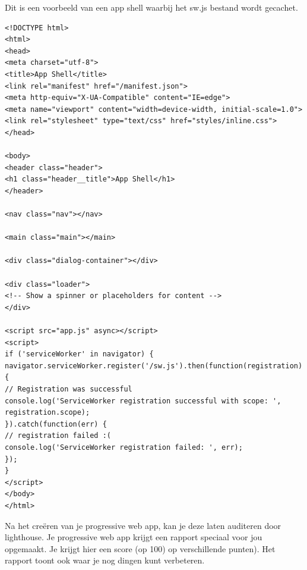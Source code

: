 Dit is een voorbeeld van een app shell waarbij het sw.js bestand wordt gecachet. 


\begin{lstlisting}
<!DOCTYPE html>
<html>
<head>
<meta charset="utf-8">
<title>App Shell</title>
<link rel="manifest" href="/manifest.json">
<meta http-equiv="X-UA-Compatible" content="IE=edge">
<meta name="viewport" content="width=device-width, initial-scale=1.0">
<link rel="stylesheet" type="text/css" href="styles/inline.css">
</head>

<body>
<header class="header">
<h1 class="header__title">App Shell</h1>
</header>

<nav class="nav"></nav>

<main class="main"></main>

<div class="dialog-container"></div>

<div class="loader">
<!-- Show a spinner or placeholders for content -->
</div>

<script src="app.js" async></script>
<script>
if ('serviceWorker' in navigator) {
navigator.serviceWorker.register('/sw.js').then(function(registration) {
// Registration was successful
console.log('ServiceWorker registration successful with scope: ', registration.scope);
}).catch(function(err) {
// registration failed :(
console.log('ServiceWorker registration failed: ', err);
});
}
</script>
</body>
</html>
\end{lstlisting}


Na het creëren van je progressive web app, kan je deze laten auditeren door lighthouse. Je progressive web app krijgt een rapport speciaal voor jou opgemaakt. Je krijgt hier een score (op 100) op verschillende punten). Het rapport toont ook waar je nog dingen kunt verbeteren.


